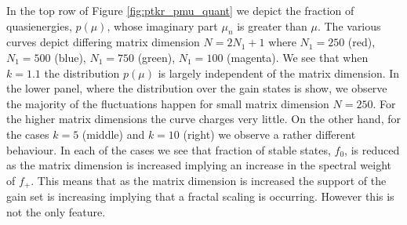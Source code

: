 \documentclass{iopart}
\begin{document}
In the top row of Figure \ref{fig:ptkr_pmu_quant} we depict the fraction of quasienergies, $p(\mu)$,  whose imaginary part $\mu_n$  is greater than $\mu$. The various curves depict differing matrix dimension $N=2N_1+1$ where $N_1=250$ (red), $N_1=500$ (blue), $N_1=750$ (green), $N_1=100$ (magenta). We see that when $k=1.1$ the distribution $p(\mu)$ is largely independent of the matrix dimension. In the lower panel, where the distribution over the gain states is show, we observe the majority of the fluctuations happen for small matrix dimension $N=250$. For the higher matrix dimensions the curve charges very little. On the other hand, for the cases $k=5$ (middle) and $k=10$ (right) we observe a rather different behaviour. In each of the cases we see that fraction of stable states, $f_0$, is reduced as the matrix dimension is increased implying an increase in the spectral weight of $f_{+}$. This means that as the matrix dimension is increased the support of the gain set is increasing implying that a fractal scaling is occurring. However this is not the only feature. 
\end{document}
